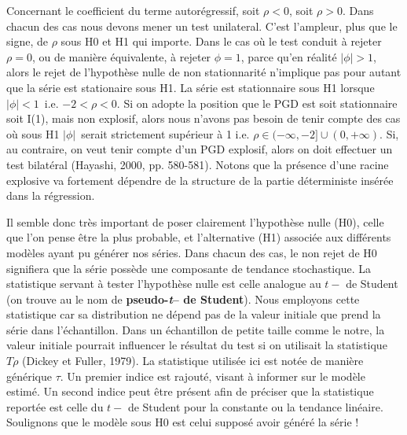 \documentclass{article}
\begin{document}
Concernant le coefficient du terme autor\'egressif, soit $\rho<0$,
soit $\rho>0$. Dans chacun des cas nous devons mener un test
unilateral. C'est l'ampleur, plus que le signe, de $\rho$ sous H0 et
H1 qui importe. Dans le cas o\`u le test conduit \`a rejeter
$\rho=0$, ou de mani\`ere \'equivalente, \`a rejeter $\phi=1$, parce
qu'en r\'ealit\'e $|\phi|>1$, alors le rejet de l'hypoth\`ese nulle
de non stationnarit\'e n'implique pas pour autant que la s\'erie est
stationaire sous H1. La s\'erie est stationnaire sous H1 lorsque
$|\phi|<1$\ i.e. $-2<\rho<0$. Si on adopte la position que le PGD
est soit stationnaire soit I(1), mais non explosif, alors nous
n'avons pas besoin de tenir compte des cas o\`u sous H1 $|\phi|$\
serait strictement sup\'erieur \`a 1 i.e.
$\rho\in(-\infty,-2]\cup(0,+\infty)$. Si, au contraire, on veut
tenir compte d'un PGD explosif, alors on doit effectuer un test
bilat\'eral (Hayashi, 2000, pp. 580-581). Notons que la pr\'esence
d'une racine explosive va fortement d\'ependre de la structure de la
partie d\'eterministe ins\'er\'ee dans la r\'egression.

Il semble donc tr\`es important de poser clairement l'hypoth\`ese
nulle (H0), celle que l'on pense \^etre la plus probable, et
l'alternative (H1) associ\'ee aux diff\'erents mod\`eles ayant pu
g\'en\'erer nos s\'eries. Dans chacun des cas, le non rejet de H0
signifiera que la s\'erie poss\`ede une composante de tendance
stochastique. La statistique servant \`a tester l'hypoth\`ese nulle
est celle analogue au $t-$ de Student (on trouve au le nom de
\textbf{pseudo-\textit{t}-- de Student}). Nous employons cette
statistique car sa distribution ne d\'epend pas de la valeur
initiale que prend la s\'erie dans l'\'echantillon. Dans un
\'echantillon de petite taille comme le notre, la valeur initiale
pourrait influencer le r\'esultat du test si on utilisait la
statistique $T\rho$ (Dickey et Fuller, 1979). La statistique
utilis\'ee ici est not\'ee de mani\`ere g\'en\'erique $\tau$. Un
premier indice est rajout\'e, visant \`a informer sur le mod\`ele
estim\'e. Un second indice peut \^etre pr\'esent afin de pr\'eciser
que la statistique report\'ee est celle du $t-$ de Student pour la
constante ou la tendance lin\'eaire. Soulignons que le mod\`ele sous
H0 est celui suppos\'e avoir g\'en\'er\'e la s\'erie !
\end{document}
